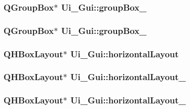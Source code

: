 \hypertarget{classUi__Gui_ade73778e93283a2c04576ace8cc6d10a}{
\subsubsection[{groupBox\_\-2}]{\setlength{\rightskip}{0pt plus 5cm}QGroupBox$\ast$ {\bf Ui\_\-Gui::groupBox\_}}}
\label{classUi__Gui_ade73778e93283a2c04576ace8cc6d10a}
\hypertarget{classUi__Gui_acaa7d078b7476294ec0b8435a0729d8c}{
\subsubsection[{groupBox\_\-3}]{\setlength{\rightskip}{0pt plus 5cm}QGroupBox$\ast$ {\bf Ui\_\-Gui::groupBox\_}}}
\label{classUi__Gui_acaa7d078b7476294ec0b8435a0729d8c}
\hypertarget{classUi__Gui_a36db684cb7cac72ebfc34ded592caf2f}{
\subsubsection[{horizontalLayout}]{\setlength{\rightskip}{0pt plus 5cm}QHBoxLayout$\ast$ {\bf Ui\_\-Gui::horizontalLayout}}}
\label{classUi__Gui_a36db684cb7cac72ebfc34ded592caf2f}
\hypertarget{classUi__Gui_a991c75b9d4ad8b476ed8bfabab40a856}{
\subsubsection[{horizontalLayout\_\-10}]{\setlength{\rightskip}{0pt plus 5cm}QHBoxLayout$\ast$ {\bf Ui\_\-Gui::horizontalLayout\_}}}
\label{classUi__Gui_a991c75b9d4ad8b476ed8bfabab40a856}
\hypertarget{classUi__Gui_aca4f37270d9455b72999cb73fd197d5d}{
\subsubsection[{horizontalLayout\_\-11}]{\setlength{\rightskip}{0pt plus 5cm}QHBoxLayout$\ast$ {\bf Ui\_\-Gui::horizontalLayout\_}}}
